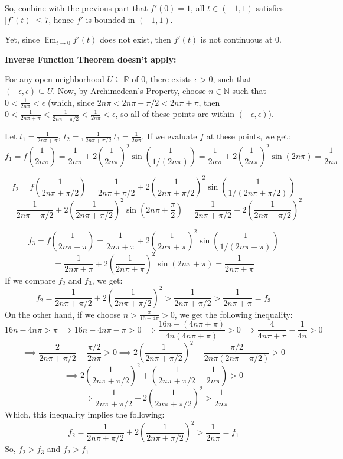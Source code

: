 \documentclass{article}
\begin{document}
So, conbine with the previous part that $f'(0)=1$, all $t\in (-1,1)$ satisfies $|f'(t)|\leq 7$, hence $f'$ is bounded in $(-1,1)$.

Yet, since $\lim_{t\rightarrow 0}f'(t)$ does not exist, then $f'(t)$ is not continuous at $0$.

\hfil

\textbf{Inverse Function Theorem doesn't apply:}

For any open neighborhood $U\subseteq \mathbb{R}$ of $0$, there exists $\epsilon>0$, such that $(-\epsilon,\epsilon)\subseteq U$. Now, by Archimedean's Property,
choose $n\in\mathbb{N}$ such that $0<\frac{1}{2n\pi}<\epsilon$ (which, since $2n\pi < 2n\pi +\pi/2 < 2n\pi +\pi$, then $0<\frac{1}{2n\pi +\pi}<\frac{1}{2n\pi +\pi/2}<\frac{1}{2n\pi}<\epsilon$, 
so all of these points are within $(-\epsilon,\epsilon)$).

Let $t_1=\frac{1}{2n\pi +\pi},\ t_2=,\frac{1}{2n\pi +\pi/2}\ t_3=\frac{1}{2n\pi}$. If we evaluate $f$ at these points, we get:
$$f_1=f\left(\frac{1}{2n\pi}\right)=\frac{1}{2n\pi}+2\left(\frac{1}{2n\pi}\right)^2\sin\left(\frac{1}{1/(2n\pi)}\right)=\frac{1}{2n\pi}+2\left(\frac{1}{2n\pi}\right)^2\sin(2n\pi) = \frac{1}{2n\pi}$$

$$f_2 = f\left(\frac{1}{2n\pi +\pi/2}\right)=\frac{1}{2n\pi +\pi/2}+2\left(\frac{1}{2n\pi +\pi/2}\right)^2\sin\left(\frac{1}{1/(2n\pi +\pi/2)}\right)$$
$$= \frac{1}{2n\pi +\pi/2}+2\left(\frac{1}{2n\pi +\pi/2}\right)^2\sin\left(2n\pi +\frac{\pi}{2}\right)=\frac{1}{2n\pi +\pi/2}+2\left(\frac{1}{2n\pi +\pi/2}\right)^2$$

$$f_3 = f\left(\frac{1}{2n\pi +\pi}\right)=\frac{1}{2n\pi +\pi}+2\left(\frac{1}{2n\pi +\pi}\right)^2\sin\left(\frac{1}{1/(2n\pi +\pi)}\right)$$
$$=\frac{1}{2n\pi +\pi}+2\left(\frac{1}{2n\pi +\pi}\right)^2\sin(2n\pi+\pi)=\frac{1}{2n\pi +\pi}$$
If we compare $f_2$ and $f_3$, we get:
$$f_2=\frac{1}{2n\pi +\pi/2}+2\left(\frac{1}{2n\pi +\pi/2}\right)^2>\frac{1}{2n\pi +\pi/2}>\frac{1}{2n\pi +\pi}=f_3$$
On the other hand, if we choose $n>\frac{\pi}{16-4\pi}>0$, we get the following inequality:
$$16n-4n\pi > \pi\implies 16n -4n\pi -\pi>0\implies \frac{16n -(4n\pi +\pi)}{4n(4n\pi +\pi)}>0 \implies \frac{4}{4n\pi +\pi}-\frac{1}{4n}>0 $$
$$\implies \frac{2}{2n\pi + \pi/2}-\frac{\pi/2}{2n\pi}>0 \implies 2\left(\frac{1}{2n\pi+\pi/2}\right)^2-\frac{\pi/2}{2n\pi(2n\pi+\pi/2)}>0$$
$$\implies 2\left(\frac{1}{2n\pi+\pi/2}\right)^2+\left(\frac{1}{2n\pi+\pi/2}-\frac{1}{2n\pi}\right)>0$$
$$\implies \frac{1}{2n\pi+\pi/2}+2\left(\frac{1}{2n\pi+\pi/2}\right)^2>\frac{1}{2n\pi}$$
Which, this inequality implies the following:
$$f_2 = \frac{1}{2n\pi+\pi/2}+2\left(\frac{1}{2n\pi+\pi/2}\right)^2 >\frac{1}{2n\pi}=f_1$$
So, $f_2>f_3$ and $f_2>f_1$
\end{document}
